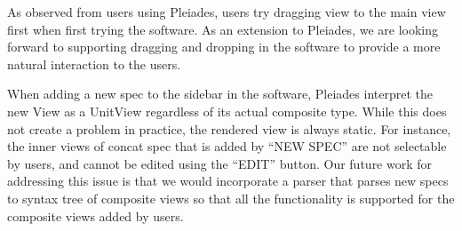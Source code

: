 \documentclass[journal]{vgtc}                %
\begin{document}
As observed from users using Pleiades, users try dragging view to the main view
first when first trying the software. As an extension to Pleiades, we are looking
forward to supporting dragging and dropping in the software to provide a more natural
interaction to the users.

When adding a new spec to the sidebar in the software, Pleiades interpret the new
View as a UnitView regardless of its actual composite type. While this does not
create a problem in practice, the rendered view is always static. For instance,
the inner views of concat spec that is added by “NEW SPEC” are not selectable by
users, and cannot be edited using the “EDIT” button.  Our future work for addressing
this issue is that we would incorporate a parser that parses new specs to syntax tree
of composite views so that all the functionality is supported for the composite
views added by users.




\end{document}
